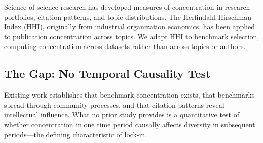 Science of science research has developed measures of concentration in research portfolios, citation patterns, and topic distributions. The Herfindahl-Hirschman Index (HHI), originally from industrial organization economics, has been applied to publication concentration across topics. We adapt HHI to benchmark selection, computing concentration across datasets rather than across topics or authors.

\subsection{The Gap: No Temporal Causality Test}

Existing work establishes that benchmark concentration exists, that benchmarks spread through community processes, and that citation patterns reveal intellectual influence. What no prior study provides is a quantitative test of whether concentration in one time period causally affects diversity in subsequent periods---the defining characteristic of lock-in.

